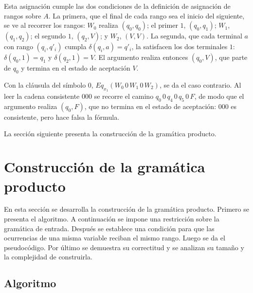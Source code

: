 \begin{center}
\end{center}

Esta asignación cumple las dos condiciones de la definición de
asignación de rangos sobre $A$. La primera, que el final de cada rango
sea el inicio del siguiente, se ve al recorrer los rangos: $W_0$ realiza
$(q_0, q_0)$; el primer $1$, $(q_0, q_1)$; $W_1$, $(q_1, q_2)$; el
segundo $1$, $(q_2, V)$; y $W_2$, $(V, V)$. La segunda, que cada terminal
$a$ con rango $(q_i, q'_i)$ cumpla $\delta(q_i, a) = q'_i$, la satisfacen
los dos terminales $1$: $\delta(q_0, 1) = q_1$ y $\delta(q_2, 1) = V$. El
argumento realiza entonces $(q_0, V)$, que parte de $q_0$ y termina en el
estado de aceptación $V$.

Con la cláusula del símbolo $0$, $Eq_{x_1}(W_0\,0\,W_1\,0\,W_2)$, se da
el caso contrario. Al leer la cadena consistente $000$ se recorre el
camino $q_0\,0\,q_4\,0\,q_5\,0\,F$, de modo que el argumento realiza
$(q_0, F)$, que no termina en el estado de aceptación: $000$ es
consistente, pero hace falsa la fórmula.

La sección siguiente presenta la construcción de la gramática producto.

\section{Construcción de la gramática producto}

En esta sección se desarrolla la construcción de la gramática
producto. Primero se presenta el algoritmo. A continuación se impone
una restricción sobre la gramática de entrada. Después se establece
una condición para que las ocurrencias de una misma variable reciban
el mismo rango. Luego se da el pseudocódigo. Por último se demuestra
su correctitud y se analizan su tamaño y la complejidad de construirla.

\subsection{Algoritmo}\label{subsec:algoritmo}

